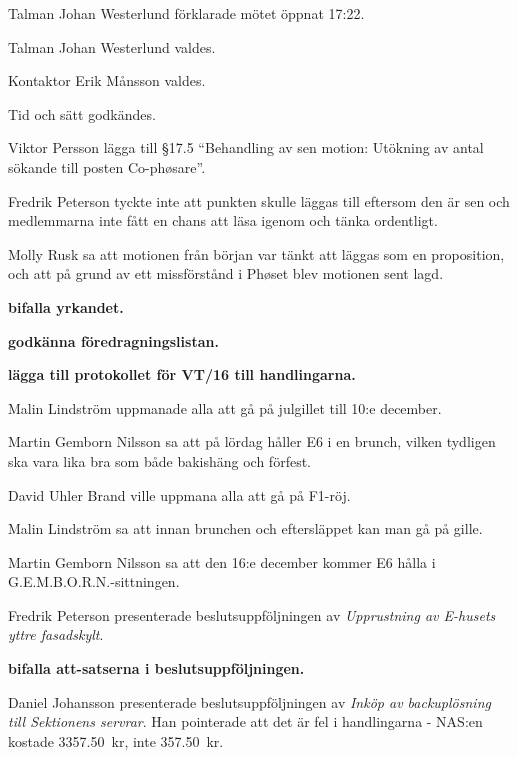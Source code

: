 \documentclass[10pt]{article}
\def\mo{Johan Westerlund}
\def\ms{Erik Månsson}
\begin{document}
\begin{paragrafer}
Talman {\mo} förklarade mötet öppnat 17:22.

Talman {\mo} valdes.

Kontaktor {\ms} valdes.

Tid och sätt godkändes.

\valavj

\emph{\ingaadj}

Viktor Persson \ypa lägga till \S17.5 ``Behandling av sen motion: Utökning av antal sökande till posten Co-phøsare''.

Fredrik Peterson tyckte inte att punkten skulle läggas till eftersom den är sen och medlemmarna inte fått en chans att läsa igenom och tänka ordentligt.

Molly Rusk sa att motionen från början var tänkt att läggas som en proposition, och att på grund av ett missförstånd i Phøset blev motionen sent lagd.

\textbf{\Mba bifalla yrkandet.}

\textbf{\Mba godkänna föredragningslistan.}

\textbf{\Mba lägga till protokollet för VT/16 till handlingarna.}

Malin Lindström uppmanade alla att gå på julgillet till 10:e december.

Martin Gemborn Nilsson sa att på lördag håller E6 i en brunch, vilken tydligen ska vara lika bra som både bakishäng och förfest.

David Uhler Brand ville uppmana alla att gå på F1-röj.

Malin Lindström sa att innan brunchen och eftersläppet kan man gå på gille.

Martin Gemborn Nilsson sa att den 16:e december kommer E6 hålla i G.E.M.B.O.R.N.-sittningen.

Fredrik Peterson presenterade beslutsuppföljningen av \emph{Upprustning av E-husets yttre fasadskylt}.

\textbf{\Mba bifalla att-satserna i beslutsuppföljningen.}

Daniel Johansson presenterade beslutsuppföljningen av \emph{Inköp av backuplösning till Sektionens servrar}. Han pointerade att det är fel i handlingarna - NAS:en kostade \SI{3357.50}{kr}, inte \SI{357.50}{kr}.


\end{paragrafer}
\end{document}

